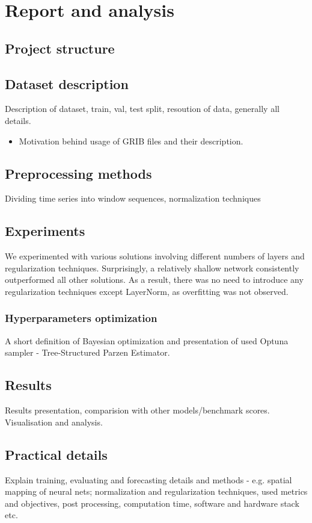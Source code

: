 \chapter{Report and analysis}\label{chap:report}

\section{Project structure}


\section{Dataset description}\label{chap:dataset}
Description of dataset, train, val, test split, resoution of data, generally all details.
\begin{itemize}
    \item Motivation behind usage of GRIB files and their description.
\end{itemize}

\section{Preprocessing methods}
Dividing time series into window sequences, normalization techniques

\section{Experiments}
We experimented with various solutions involving different numbers of layers and regularization techniques. Surprisingly, a relatively shallow network consistently outperformed all other solutions. As a result, there was no need to introduce any regularization techniques except LayerNorm, as overfitting was not observed.

\subsection{Hyperparameters optimization}
A short definition of Bayesian optimization and presentation of used Optuna sampler - Tree-Structured Parzen Estimator.~\cite{watanabe2023treestructured} 

\section{Results}
Results presentation, comparision with other models/benchmark scores. Visualisation and analysis.

\section{Practical details}
Explain training, evaluating and forecasting details and methods - e.g. spatial mapping of neural nets;
normalization and regularization techniques, used metrics and objectives, post processing, computation time, software and hardware stack etc. 
